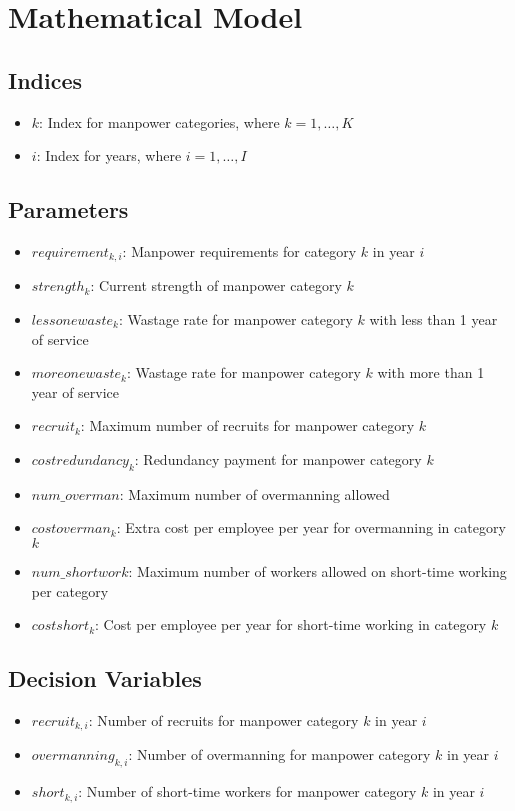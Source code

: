 \documentclass{article}
\begin{document}
\section*{Mathematical Model}

\subsection*{Indices}
\begin{itemize}
    \item $k$: Index for manpower categories, where $k = 1, \ldots, K$
    \item $i$: Index for years, where $i = 1, \ldots, I$
\end{itemize}

\subsection*{Parameters}
\begin{itemize}
    \item $requirement_{k, i}$: Manpower requirements for category $k$ in year $i$
    \item $strength_{k}$: Current strength of manpower category $k$
    \item $lessonewaste_{k}$: Wastage rate for manpower category $k$ with less than 1 year of service
    \item $moreonewaste_{k}$: Wastage rate for manpower category $k$ with more than 1 year of service
    \item $recruit_{k}$: Maximum number of recruits for manpower category $k$
    \item $costredundancy_{k}$: Redundancy payment for manpower category $k$
    \item $num\_overman$: Maximum number of overmanning allowed
    \item $costoverman_{k}$: Extra cost per employee per year for overmanning in category $k$
    \item $num\_shortwork$: Maximum number of workers allowed on short-time working per category
    \item $costshort_{k}$: Cost per employee per year for short-time working in category $k$
\end{itemize}

\subsection*{Decision Variables}
\begin{itemize}
    \item $recruit_{k, i}$: Number of recruits for manpower category $k$ in year $i$
    \item $overmanning_{k, i}$: Number of overmanning for manpower category $k$ in year $i$
    \item $short_{k, i}$: Number of short-time workers for manpower category $k$ in year $i$
\end{itemize}
\end{document}

